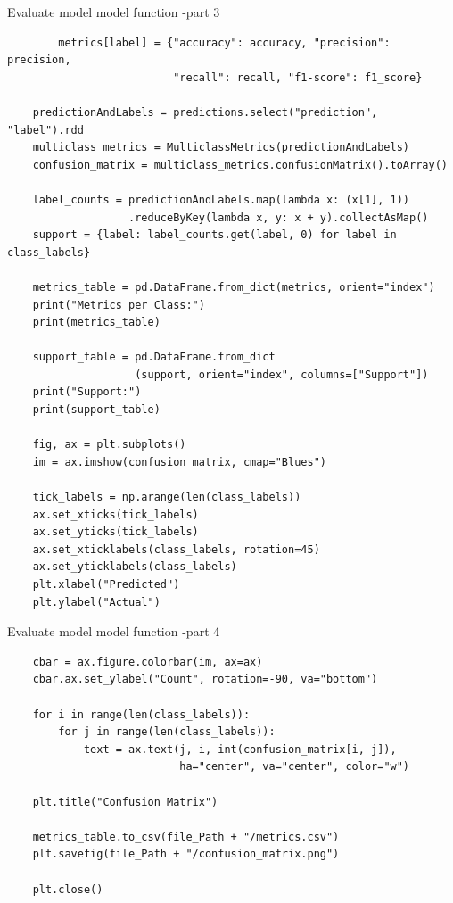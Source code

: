 \begin{listing}[H]
\caption{Evaluate model model function -part 3}
\begin{verbatim}
        metrics[label] = {"accuracy": accuracy, "precision": precision, 
                          "recall": recall, "f1-score": f1_score}

    predictionAndLabels = predictions.select("prediction", "label").rdd
    multiclass_metrics = MulticlassMetrics(predictionAndLabels)
    confusion_matrix = multiclass_metrics.confusionMatrix().toArray()

    label_counts = predictionAndLabels.map(lambda x: (x[1], 1))
                   .reduceByKey(lambda x, y: x + y).collectAsMap()
    support = {label: label_counts.get(label, 0) for label in class_labels}

    metrics_table = pd.DataFrame.from_dict(metrics, orient="index")
    print("Metrics per Class:")
    print(metrics_table)

    support_table = pd.DataFrame.from_dict
                    (support, orient="index", columns=["Support"])
    print("Support:")
    print(support_table)

    fig, ax = plt.subplots()
    im = ax.imshow(confusion_matrix, cmap="Blues")

    tick_labels = np.arange(len(class_labels))
    ax.set_xticks(tick_labels)
    ax.set_yticks(tick_labels)
    ax.set_xticklabels(class_labels, rotation=45)
    ax.set_yticklabels(class_labels)
    plt.xlabel("Predicted")
    plt.ylabel("Actual")
\end{verbatim}
\end{listing}

\begin{listing}[H]
\caption{Evaluate model model function -part 4}
\begin{verbatim}
    cbar = ax.figure.colorbar(im, ax=ax)
    cbar.ax.set_ylabel("Count", rotation=-90, va="bottom")

    for i in range(len(class_labels)):
        for j in range(len(class_labels)):
            text = ax.text(j, i, int(confusion_matrix[i, j]), 
                           ha="center", va="center", color="w")

    plt.title("Confusion Matrix")
    
    metrics_table.to_csv(file_Path + "/metrics.csv")
    plt.savefig(file_Path + "/confusion_matrix.png")

    plt.close()
\end{verbatim}
\end{listing}

